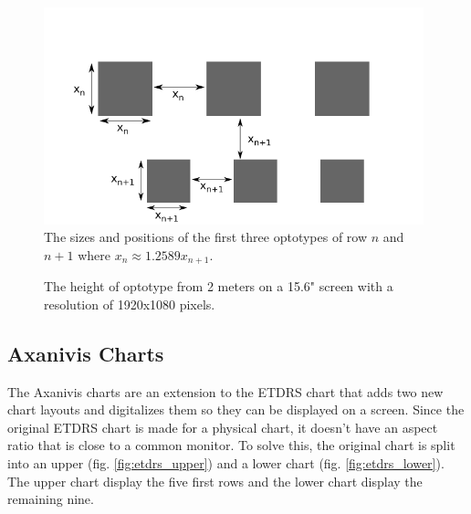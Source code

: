 \documentclass[12pt,a4paper,notitlepage]{report}
\begin{document}
\begin{figure}[ht!]
\centering
\includegraphics[width=110mm]{images/etdrs_chart_sizes.png}
\caption{The sizes and positions of the first three optotypes of row $n$ and $n+1$ where $x_n \approx 1.2589 x_{n+1}$. \label{fig:etdrs_chart_sizes}}
\end{figure} 

\begin{figure}[ht!]
\caption{The height of optotype from 2 meters on a 15.6" screen with a resolution of 1920x1080 pixels. \label{fig:chart_size_plot}}
\end{figure}

\subsection{Axanivis Charts}
The Axanivis charts are an extension to the ETDRS chart that adds two new chart layouts and digitalizes them so they can be displayed on a screen. Since the original ETDRS chart is made for a physical chart, it doesn't have an aspect ratio \cite{Ferris} that is close to a common monitor. To solve this, the original chart is split into an upper (fig. \ref{fig:etdrs_upper}) and a lower chart (fig. \ref{fig:etdrs_lower}). The upper chart display the five first rows and the lower chart display the remaining nine.
\end{document}
